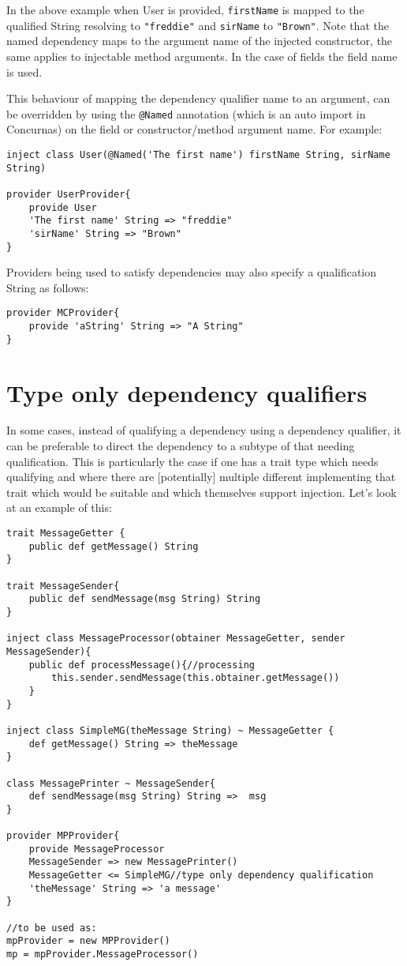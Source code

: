 \documentclass[conc-doc]{subfiles}
\begin{document}
In the above example when User is provided, \lstinline{firstName} is mapped to the qualified String resolving to \lstinline{"freddie"} and \lstinline{sirName} to \lstinline{"Brown"}. Note that the named dependency maps to the argument name of the injected constructor, the same applies to injectable method arguments. In the case of fields the field name is used.

This behaviour of mapping the dependency qualifier name to an argument, can be overridden by using the \lstinline{@Named} annotation (which is an auto import in Concurnas) on the field or constructor/method argument name. For example:
\begin{lstlisting}
inject class User(@Named('The first name') firstName String, sirName String)

provider UserProvider{
	provide User
	'The first name' String => "freddie"
	'sirName' String => "Brown"
}
\end{lstlisting}

Providers being used to satisfy dependencies may also specify a qualification String as follows:
\begin{lstlisting}
provider MCProvider{
	provide 'aString' String => "A String"
}
\end{lstlisting}

\section{Type only dependency qualifiers}
In some cases, instead of qualifying a dependency using a dependency qualifier, it can be preferable to direct the dependency to a subtype of that needing qualification. This is particularly the case if one has a trait type which needs qualifying and where there are [potentially] multiple different implementing that trait which would be suitable and which themselves support injection. Let's look at an example of this:
\begin{lstlisting}
trait MessageGetter {
	public def getMessage() String
}

trait MessageSender{
	public def sendMessage(msg String) String
}

inject class MessageProcessor(obtainer MessageGetter, sender MessageSender){
	public def processMessage(){//processing
		this.sender.sendMessage(this.obtainer.getMessage())
	}
}

inject class SimpleMG(theMessage String) ~ MessageGetter {
	def getMessage() String => theMessage
}

class MessagePrinter ~ MessageSender{
	def sendMessage(msg String) String =>  msg
}

provider MPProvider{
	provide MessageProcessor
	MessageSender => new MessagePrinter()
	MessageGetter <= SimpleMG//type only dependency qualification
	'theMessage' String => 'a message'
}

//to be used as:
mpProvider = new MPProvider()
mp = mpProvider.MessageProcessor()
\end{lstlisting}
\end{document}
